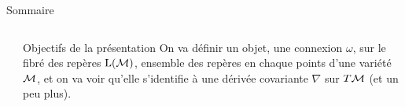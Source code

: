 \begin{frame}{Sommaire}
    \begin{columns}
        \begin{column}{0.4\textwidth}
            \tableofcontents
        \end{column}
        \begin{column}{0.5\textwidth}
            \begin{block}{Objectifs de la présentation}
                On va définir un objet, une \alert{connexion $\omega$}, sur le \alert{fibré des repères $\text{L}(\mathcal{M})$, ensemble des repères en chaque points d'une variété $\mathcal{M}$}, et on va voir qu'elle s'identifie à une \alert{dérivée covariante $\nabla$ sur $T\mathcal{M}$} (et un peu plus).
            \end{block}
        \end{column}
    \end{columns}
\end{frame}